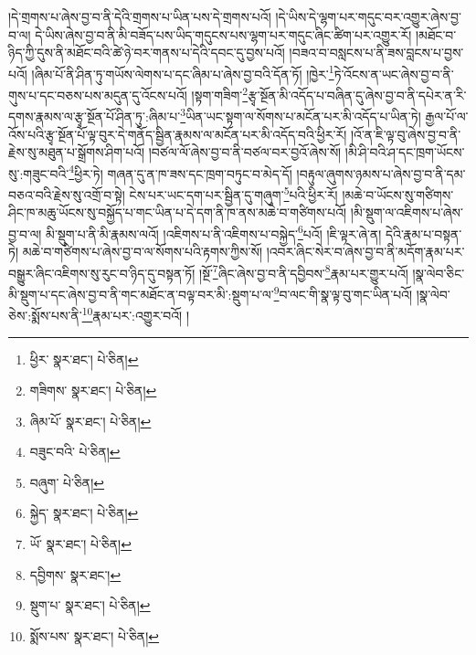 །དེ་གྲགས་པ་ཞེས་བྱ་བ་ནི་དེའི་གྲགས་པ་ཡིན་པས་དེ་གྲགས་པའོ། །དེ་ཡིས་དེ་ལྷག་པར་གདུང་བར་འགྱུར་ཞེས་བྱ་བ་ལ། དེ་ཡིས་ཞེས་བྱ་བ་ནི་མི་བཟོད་པས་ཡིད་གདུངས་པས་ལྷག་པར་གདུང་ཞིང་ཚིག་པར་འགྱུར་རོ། །མཐོང་བ་ཉིད་ཀྱི་དུས་ནི་མཐོང་བའི་ཚེ་ཉེ་བར་གནས་པ་དེའི་དབང་དུ་བྱས་པའོ། །བཟའ་བ་བསླངས་པ་ནི་ཟས་བླངས་པ་བྱས་པའོ། །ཞིམ་པོ་ནི་ཤིན་ཏུ་གཡོས་ལེགས་པ་དང་ཞིམ་པ་ཞེས་བྱ་བའི་དོན་ཏོ། །ཁྱེར་\footnote{ཕྱིར་  སྣར་ཐང་།  པེ་ཅིན། }ཏེ་འོངས་ན་ཡང་ཞེས་བྱ་བ་ནི་གུས་པ་དང་བཅས་པས་མདུན་དུ་འོངས་པའོ། །སྟག་གཟིག་\footnote{གཟིགས་  སྣར་ཐང་།  པེ་ཅིན། }རྩྭ་སྔོན་མི་འདོད་པ་བཞིན་དུ་ཞེས་བྱ་བ་ནི་དཔེར་ན་རི་དགས་རྣམས་ལ་རྩྭ་སྔོན་པོ་ཤིན་ཏུ་:ཞིམ་པ་\footnote{ཞིམ་པོ་  སྣར་ཐང་།  པེ་ཅིན། }ཡིན་ཡང་སྟག་ལ་སོགས་པ་མངོན་པར་མི་འདོད་པ་ཡིན་ཏེ། རྒྱལ་པོ་ལ་འོས་པའི་རྩྭ་སྔོན་པོ་ལྟ་བུར་དེ་གནོད་སྦྱིན་རྣམས་ལ་མངོན་པར་མི་འདོད་བའི་ཕྱིར་རོ། །འོ་ན་ཇི་ལྟ་བུ་ཞེས་བྱ་བ་ནི་རྗེས་སུ་མཐུན་པ་སྒྲོགས་ཤིག་པའོ། །བཙལ་ལོ་ཞེས་བྱ་བ་ནི་བཙལ་བར་བྱའོ་ཞེས་སོ། །མི་ཤི་བའི་ཤ་དང་ཁྲག་ཡོངས་སུ་:གཟུང་བའི་\footnote{བཟུང་བའི་  པེ་ཅིན། }ཕྱིར་ཏེ། གཞན་དུ་ན་ཁ་ཟས་དང་ཁྲག་བཏུང་བ་མེད་དོ། །བརྟུལ་ཞུགས་ཉམས་པ་ཞེས་བྱ་བ་ནི་དམ་བཅའ་བའི་རྗེས་སུ་འགྲོ་བ་སྟེ། ངེས་པར་ཡང་དག་པར་སྦྱིན་དུ་གཞུག་\footnote{བཞུག་  པེ་ཅིན། }པའི་ཕྱིར་རོ། །མཆེ་བ་ཡོངས་སུ་གཙིགས་ཤིང་ཁ་མཆུ་ཡོངས་སུ་བསྐྱོད་པ་གང་ཡིན་པ་དེ་དག་ནི་ཁ་ནས་མཆེ་བ་གཙིགས་པའོ། །མི་སྡུག་ལ་འཇིགས་པ་ཞེས་བྱ་བ་ལ། མི་སྡུག་པ་ནི་མི་རྣམས་ལའོ། །འཇིགས་པ་ནི་འཇིགས་པ་བསྐྱེད་\footnote{སྐྱེད་  སྣར་ཐང་།  པེ་ཅིན། }པའོ། །ཇི་ལྟར་ཞེ་ན། དེའི་རྣམ་པ་བསྟན་ཏེ། མཆེ་བ་གཙིགས་པ་ཞེས་བྱ་བ་ལ་སོགས་པའི་རྟགས་ཀྱིས་སོ། །འབར་ཞིང་སེར་བ་ཞེས་བྱ་བ་ནི་མདོག་རྣམ་པར་བསྒྱུར་ཞིང་འཇིགས་སུ་རུང་བ་ཉིད་དུ་བསྟན་ཏོ། །སྔོ་\footnote{ཡོ་  སྣར་ཐང་།  པེ་ཅིན། }ཞིང་ཞེས་བྱ་བ་ནི་དབྱིབས་\footnote{དབྱིགས་  སྣར་ཐང་། }རྣམ་པར་གྱུར་པའོ། །སྣ་ལེབ་ཅིང་མི་སྡུག་པ་དང་ཞེས་བྱ་བ་ནི་གང་མཐོང་ན་བལྟ་བར་མི་:སྡུག་པ་ལ་\footnote{སྡུག་པ་  སྣར་ཐང་།  པེ་ཅིན། }བ་ལང་གི་སྣ་ལྟ་བུ་གང་ཡིན་པའོ། །སྣ་ལེབ་ཅེས་:སྨོས་པས་ནི་\footnote{སྨོས་པས་  སྣར་ཐང་།  པེ་ཅིན། }རྣམ་པར་:འགྱུར་བའོ། །
